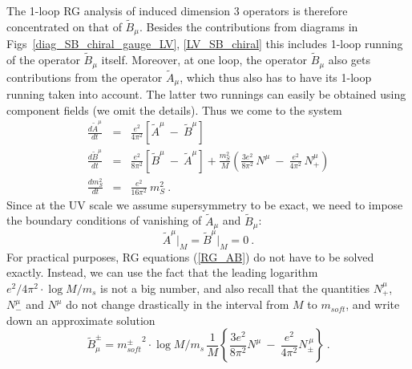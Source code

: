 \documentclass[12pt]{revtex4}
\begin{document}
	The 1-loop RG analysis of induced dimension 3 operators is therefore 
	concentrated on that of $ \widetilde{B}_\mu $.
	Besides the contributions from diagrams
	in Figs~\ref{diag_SB_chiral_gauge_LV}, \ref{LV_SB_chiral} this includes
	1-loop running of the operator $ \widetilde{B}_\mu $ itself.
	Moreover, at one loop, the operator $ \widetilde{B}_\mu $ also gets contributions
	from the operator $ \widetilde{A}_\mu $, which thus also has to have its
	1-loop running taken into account. 
	The latter two runnings can easily be obtained using component fields
	(we omit the details).
	Thus we come to the system
\begin{eqnarray}
\label{RG_AB}
\nonumber
        \frac{d \widetilde{A}^\mu}
                 {dt}               & = &
        \frac{e^2}{4\pi^2}  \left [    \widetilde{A}^\mu  ~-~ \widetilde{B}^\mu  \right ]
        \\
        \frac{d \widetilde{B}^\mu}
                 {dt}               & = &
        \frac{e^2}{8\pi^2}  \left [    \widetilde{B}^\mu  ~-~ \widetilde{A}^\mu  \right ] 
        +
        \frac{m_S^2}{M}
        \left (
                \frac{3e^2}
                    {8\pi^2}\, N^\mu 
                ~-~
                \frac{e^2}
                    {4\pi^2}\, N_+^\mu 
        \right )
        \\
\nonumber
        \frac{d m_S^2}
               {dt}                 & = &
        \frac{e^2}{16\pi^2}~ m_S^2~.
\end{eqnarray}
	Since at the UV scale we assume supersymmetry to be exact, we need to impose
	the boundary conditions of vanishing of $ \widetilde{A}_\mu $ and 
	$ \widetilde{B}_\mu $:
\[
        \widetilde{A}^\mu \Bigr|_M = \widetilde{B}^\mu \Bigr|_M = 0~.
\]  
	For practical purposes, RG equations (\ref{RG_AB}) do not have to be
	solved exactly. 
	Instead, we can use the fact that the leading logarithm
$ e^2/4\pi^2 \cdot \log M/m_s $
	is not a big number, and also recall that the quantities $ N_+^\mu $,
	$ N_-^\mu $ and $ N^\mu $ do not change drastically in the interval
	from $ M $ to $ m_{soft} $, and write down an approximate solution
\begin{equation}
\label{B_mu_coef}
\widetilde{B}^\pm_\mu = 
{m_{soft}^\pm}^2 \cdot \log M/m_s\,
\frac{1}{M}
\left \{ 
\frac{3e^2}
     {8\pi^2} N^\mu 
~-~
\frac{e^2}
     {4\pi^2} N_\pm^{\,\mu}
\right \}~.
\end{equation}
\end{document}

